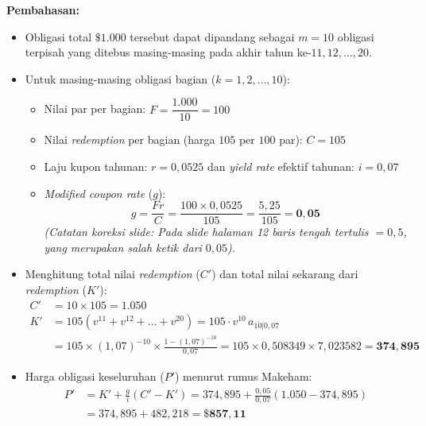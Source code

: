 \documentclass[11pt,a4paper]{article}
\begin{document}
\begin{examplebox}
\tcblower
\textbf{Pembahasan:}
\begin{itemize}[topsep=2pt, itemsep=2pt]
    \item Obligasi total $\$1.000$ tersebut dapat dipandang sebagai $m = 10$ obligasi terpisah yang ditebus masing-masing pada akhir tahun ke-$11, 12, \dots, 20$.
    \item Untuk masing-masing obligasi bagian ($k = 1, 2, \dots, 10$):
    \begin{itemize}
        \item Nilai par per bagian: $F = \dfrac{1.000}{10} = 100$
        \item Nilai \textit{redemption} per bagian (harga $105$ per $100$ par): $C = 105$
        \item Laju kupon tahunan: $r = 0{,}0525$ dan \textit{yield rate} efektif tahunan: $i = 0{,}07$
        \item \textit{Modified coupon rate} ($g$):
        \[
            g = \frac{Fr}{C} = \frac{100 \times 0{,}0525}{105} = \frac{5{,}25}{105} = \mathbf{0{,}05}
        \]
        {\footnotesize \textit{(Catatan koreksi slide: Pada slide halaman 12 baris tengah tertulis $= 0{,}5$, yang merupakan salah ketik dari $0{,}05$).}}
    \end{itemize}
    \item Menghitung total nilai \textit{redemption} ($C'$) dan total nilai sekarang dari \textit{redemption} ($K'$):
    \begin{align*}
        C' &= 10 \times 105 = \mathbf{1.050} \\
        K' &= 105\left(v^{11} + v^{12} + \dots + v^{20}\right) = 105 \cdot v^{10} \, a_{\overline{10}|0{,}07} \\
        &= 105 \times (1{,}07)^{-10} \times \frac{1 - (1{,}07)^{-10}}{0{,}07} = 105 \times 0{,}508349 \times 7{,}023582 = \mathbf{374{,}895}
    \end{align*}
    \item Harga obligasi keseluruhan ($P'$) menurut rumus Makeham:
    \begin{align*}
        P' &= K' + \frac{g}{i}(C' - K') = 374{,}895 + \frac{0{,}05}{0{,}07}\left(1.050 - 374{,}895\right) \\
           &= 374{,}895 + 482{,}218 = \mathbf{\$857{,}11}
    \end{align*}
\end{itemize}
\end{examplebox}

\end{document}
